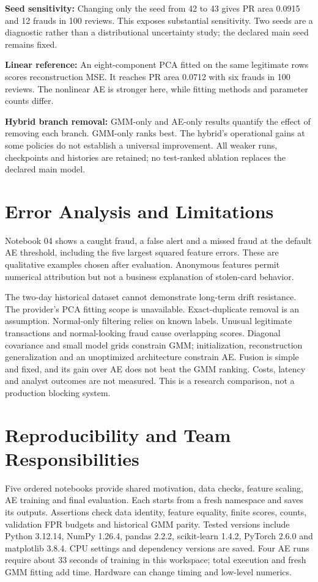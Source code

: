 \documentclass[conference]{IEEEtran}
\begin{document}
\textbf{Seed sensitivity:} Changing only the seed from 42 to 43 gives PR area 0.0915 and 12 frauds in 100 reviews. This exposes substantial sensitivity. Two seeds are a diagnostic rather than a distributional uncertainty study; the declared main seed remains fixed.

\textbf{Linear reference:} An eight-component PCA fitted on the same legitimate rows scores reconstruction MSE. It reaches PR area 0.0712 with six frauds in 100 reviews. The nonlinear AE is stronger here, while fitting methods and parameter counts differ.

\textbf{Hybrid branch removal:} GMM-only and AE-only results quantify the effect of removing each branch. GMM-only ranks best. The hybrid's operational gains at some policies do not establish a universal improvement. All weaker runs, checkpoints and histories are retained; no test-ranked ablation replaces the declared main model.

\section{Error Analysis and Limitations}
Notebook 04 shows a caught fraud, a false alert and a missed fraud at the default AE threshold, including the five largest squared feature errors. These are qualitative examples chosen after evaluation. Anonymous features permit numerical attribution but not a business explanation of stolen-card behavior.

The two-day historical dataset cannot demonstrate long-term drift resistance. The provider's PCA fitting scope is unavailable. Exact-duplicate removal is an assumption. Normal-only filtering relies on known labels. Unusual legitimate transactions and normal-looking fraud cause overlapping scores. Diagonal covariance and small model grids constrain GMM; initialization, reconstruction generalization and an unoptimized architecture constrain AE. Fusion is simple and fixed, and its gain over AE does not beat the GMM ranking. Costs, latency and analyst outcomes are not measured. This is a research comparison, not a production blocking system.

\section{Reproducibility and Team Responsibilities}
Five ordered notebooks provide shared motivation, data checks, feature scaling, AE training and final evaluation. Each starts from a fresh namespace and saves its outputs. Assertions check data identity, feature equality, finite scores, counts, validation FPR budgets and historical GMM parity. Tested versions include Python 3.12.14, NumPy 1.26.4, pandas 2.2.2, scikit-learn 1.4.2, PyTorch 2.6.0 and matplotlib 3.8.4. CPU settings and dependency versions are saved. Four AE runs require about 33 seconds of training in this workspace; total execution and fresh GMM fitting add time. Hardware can change timing and low-level numerics.
\end{document}
